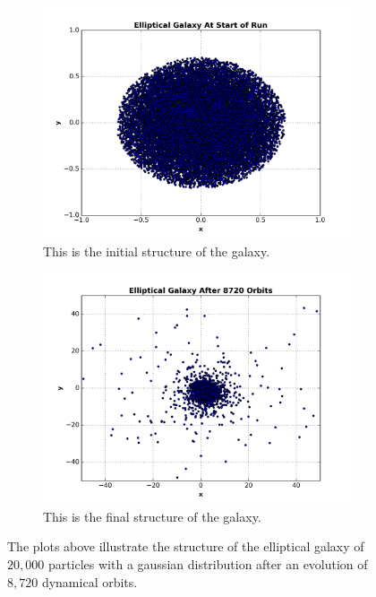 \documentclass[12pt]{report}
\begin{document}
\begin{figure}[H]
\centering 
    \begin{subfigure}[b]{.475\textwidth}
        \centering
        \includegraphics[width=\linewidth]{intiial_structure_of_cloud.png}
        \caption[]%
        {{\small This is the initial structure of the galaxy.}}
        \label{fig:initialstruct}
    \end{subfigure} %
    \hfill
    \begin{subfigure}[b]{.475\textwidth}
        \centering
        \includegraphics[width=\linewidth]{final_structure_of_cloud.png}
        \caption[]%
        {{\small This is the final structure of the galaxy.}}
        \label{fig:finalstr}
    \end{subfigure} %
    \caption[]
        {The plots above illustrate the structure of the elliptical galaxy of $20,000$ particles with a gaussian distribution after an evolution of $8,720$ dynamical orbits.} 
        \label{fig:cloudstructure}
\end{figure}
\end{document}

